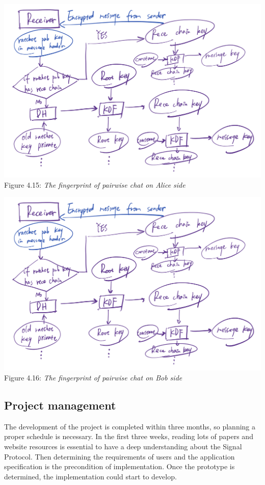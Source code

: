 \begin{enumerate}[label=(\roman*)]
\begin{center}
\includegraphics[scale=.5]{../3-Background/resources/DH-rece.png}\\
Figure 4.15: \textit{The fingerprint of pairwise chat on Alice side}
\end{center}

\begin{center}
\includegraphics[scale=.5]{../3-Background/resources/DH-rece.png}\\
Figure 4.16: \textit{The fingerprint of pairwise chat on Bob side}
\end{center}

\end{enumerate}

\subsection{Project management}
The development of the project is completed within three months, so planning a proper schedule is necessary. In the first three weeks, reading lots of papers and website resources is essential to have a deep understanding about the Signal Protocol. Then determining the requirements of users and the application specification is the precondition of implementation. Once the prototype is determined, the implementation could start to develop.

